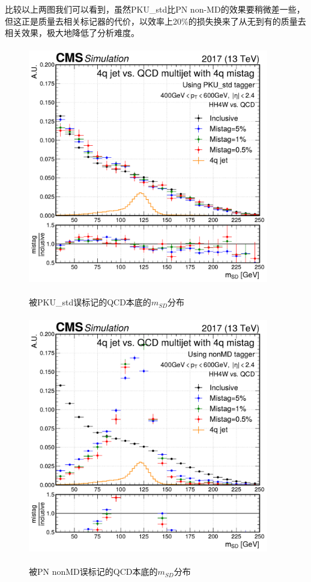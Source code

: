 比较以上两图我们可以看到，虽然PKU\_std比PN non-MD的效果要稍微差一些，但这正是质量去相关标记器的代价，以效率上20\%的损失换来了从无到有的质量去相关效果，极大地降低了分析难度。
\begin{figure}[H]
 \centering
 \caption{被PKU\_std误标记的QCD本底的$m_{SD}$分布}
 \includegraphics[height=10.5cm, width=10.5cm]{pictures/MD_PKU_std_4q.pdf}
 \label{fig:5.3}
\end{figure}

\begin{figure}[H]
 \centering
 \caption{被PN nonMD误标记的QCD本底的$m_{SD}$分布}
 \includegraphics[height=10.5cm, width=10.5cm]{pictures/MD_nonMD_4q.pdf}
 \label{fig:5.4}
\end{figure}

